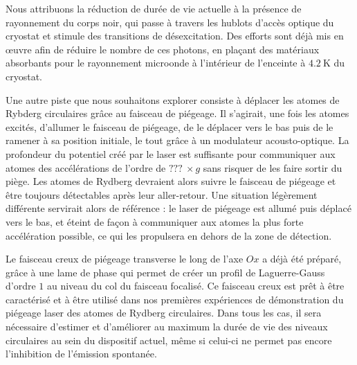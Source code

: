 Nous attribuons la réduction de durée de vie actuelle à la présence de rayonnement du corps noir, qui passe à travers les hublots d'accès optique du cryostat et stimule des transitions de désexcitation.
Des efforts sont déjà mis en \oe uvre afin de réduire le nombre de ces photons, en plaçant des matériaux absorbants pour le rayonnement microonde à l'intérieur de l'enceinte à $\SI{4.2}{\K}$ du cryostat.

Une autre piste que nous souhaitons explorer consiste à déplacer les atomes de Rybderg circulaires grâce au faisceau de piégeage.
Il s'agirait, une fois les atomes excités, d'allumer le faisceau de piégeage, de le déplacer vers le bas puis de le ramener à sa position initiale, le tout grâce à un modulateur acousto-optique.
La profondeur du potentiel créé par le laser est suffisante pour communiquer aux atomes des accélérations de l'ordre de $???\SI{}{}\times g$ sans risquer de les faire sortir du piège.
Les atomes de Rydberg devraient alors suivre le faisceau de piégeage et être toujours détectables après leur aller-retour.
Une situation légèrement différente servirait alors de référence : le laser de piégeage est allumé puis déplacé vers le bas, et éteint de façon à communiquer aux atomes la plus forte accélération possible, ce qui les propulsera en dehors de la zone de détection.

Le faisceau creux de piégeage transverse le long de l'axe $Ox$ a déjà été préparé, grâce à une lame de phase qui permet de créer un profil de Laguerre-Gauss d'ordre $1$ au niveau du col du faisceau focalisé.
Ce faisceau creux est prêt à être caractérisé et à être utilisé dans nos premières expériences de démonstration du piégeage laser des atomes de Rydberg circulaires.
Dans tous les cas, il sera nécessaire d'estimer et d'améliorer au maximum la durée de vie des niveaux circulaires au sein du dispositif actuel, même si celui-ci ne permet pas encore l'inhibition de l'émission spontanée.


